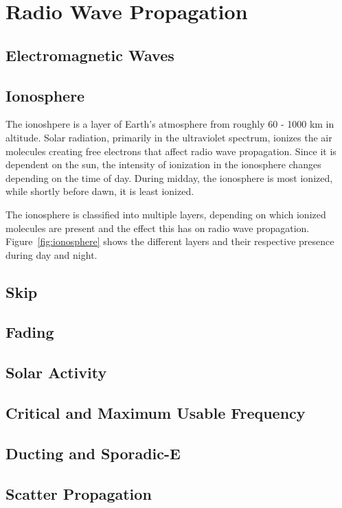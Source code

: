 \section{Radio Wave Propagation}

\subsection{Electromagnetic Waves}

\subsection{Ionosphere}

The ionoshpere is a layer of Earth's atmosphere from roughly 60 - 1000 km in altitude. Solar radiation, primarily in the ultraviolet spectrum, ionizes the air molecules creating free electrons that affect radio wave propagation. Since it is dependent on the sun, the intensity of ionization in the ionosphere changes depending on the time of day. During midday, the ionosphere is most ionized, while shortly before dawn, it is least ionized.

The ionosphere is classified into multiple layers, depending on which ionized molecules are present and the effect this has on radio wave propagation. Figure~\ref{fig:ionosphere} shows the different layers and their respective presence during day and night.

\subsection{Skip}

\subsection{Fading}

\subsection{Solar Activity}

\subsection{Critical and Maximum Usable Frequency}

\subsection{Ducting and Sporadic-E}

\subsection{Scatter Propagation}
